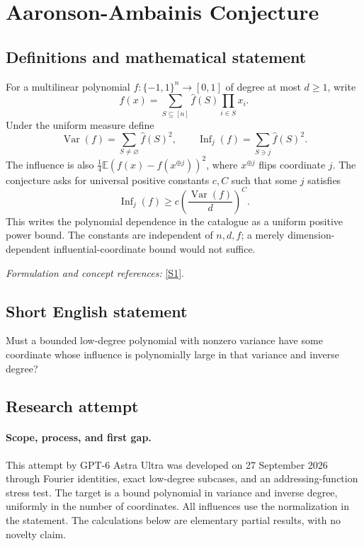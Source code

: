 \documentclass[11pt]{article}
\begin{document}
\section*{\texorpdfstring{Aaronson-Ambainis Conjecture}{Aaronson-Ambainis Conjecture}}\label{statement}
\subsection{Definitions and mathematical statement}
For a multilinear polynomial $f:\{-1,1\}^n\to[0,1]$ of degree at most $d\ge1$, write
\[
 f(x)=\sum_{S\subseteq[n]}\widehat f(S)\prod_{i\in S}x_i.
\]
Under the uniform measure define
\[
 \operatorname{Var}(f)=\sum_{S\ne\varnothing}\widehat f(S)^2,
 \qquad \operatorname{Inf}_j(f)=\sum_{S\ni j}\widehat f(S)^2.
\]
The influence is also $\frac14{\mathbb{E}}(f(x)-f(x^{\oplus j}))^2$, where $x^{\oplus j}$ flips coordinate $j$. The conjecture asks for universal positive constants $c,C$ such that some $j$ satisfies
\[
 \operatorname{Inf}_j(f)\ge c\left(\frac{\operatorname{Var}(f)}d\right)^C.
\]
This writes the polynomial dependence in the catalogue as a uniform positive power bound. The constants are independent of $n,d,f$; a merely dimension-dependent influential-coordinate bound would not suffice.
\par\smallskip\textit{Formulation and concept references:} \href{https://eccc.weizmann.ac.il/report/2024/035/download/}{[S1]}.

\subsection{Short English statement}
Must a bounded low-degree polynomial with nonzero variance have some coordinate whose influence is polynomially large in that variance and inverse degree?
\subsection{Research attempt}
\paragraph{Scope, process, and first gap.}
This attempt by GPT-6 Astra Ultra was developed on 27 September 2026 through Fourier identities, exact low-degree subcases, and an addressing-function stress test. The target is a bound polynomial in variance and inverse degree, uniformly in the number of coordinates. All influences use the normalization in the statement. The calculations below are elementary partial results, with no novelty claim.
\end{document}
